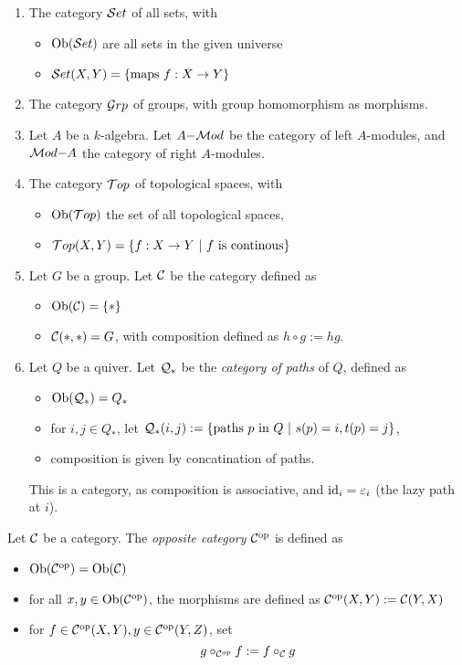 \begin{bsp}
  \begin{enumerate}
    \item The category $\mathcal{S}et$ of all sets, with
    \begin{itemize}
      \item $\text{Ob}(\mathcal{S}et)$ are all sets in the given universe
      \item $\mathcal{S}et(X,Y)=\{\text{maps }f:X\to Y\}$
    \end{itemize}
    \item The category $\mathcal{G}rp$ of groups, with group homomorphism as morphisms.
    \item Let $A$ be a $k$-algebra. Let $A\mathrm{-} \mathcal{M}od$ be the category of left $A$-modules, and $\mathcal{M}od\mathrm{-} A$ the category of right $A$-modules.
    \item The category $\mathcal{T}op$ of topological spaces, with
    \begin{itemize}
      \item $\text{Ob}(\mathcal{T}op)$ the set of all topological spaces,
      \item $\mathcal{T}op(X,Y)=\{f:X\to Y~|~ f\text{ is continous}\}$
    \end{itemize}
    \item Let $G$ be a group. Let $\mathcal{C}$ be the category defined as
    \begin{itemize}
      \item $\text{Ob}(\mathcal{C})=\{\ast\}$
      \item $\mathcal{C}(\ast,\ast)=G$, with composition defined as $h\circ g:= hg$.
    \end{itemize}
    \item Let $Q$ be a quiver. Let $\mathcal{Q}_{\ast}$ be the \emph{category of paths} of $Q$, defined as
    \begin{itemize}
      \item $\text{Ob}(\mathcal{Q}_{\ast})=Q_{\ast}$
      \item for $i,j\in Q_{\ast}$, let $\mathcal{Q}_{\ast}(i,j):= \{\text{paths }p\text{ in }Q~|~ s(p)=i,t(p)=j\}$,
      \item composition is given by concatination of paths.
    \end{itemize}
    This is a category, as composition is associative, and $\operatorname{id}_i=\varepsilon_i$ (the lazy path at $i$).
  \end{enumerate}
\end{bsp}
\begin{defn}
  Let $\mathcal{C}$ be a category. The \emph{opposite category}  $\mathcal{C}^{\mathrm{op}}$ is defined as
  \begin{itemize}
    \item $\text{Ob}(\mathcal{C}^{\mathrm{op}})=\text{Ob}(\mathcal{C})$
    \item for all $x,y\in \text{Ob}(\mathcal{C}^{\mathrm{op}})$, the morphisms are defined as $\mathcal{C}^{\mathrm{op}}(X,Y):= \mathcal{C}(Y,X)$
    \item for $f\in \mathcal{C}^{\mathrm{op}}(X,Y),y\in \mathcal{C}^{\mathrm{op}}(Y,Z)$, set
    \[
    g\circ_{\mathcal{C}^{\mathrm{op}}}f:= f\circ_{\mathcal{C}}g\]
  \end{itemize}
\end{defn}

